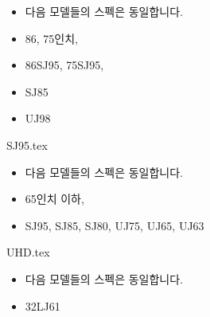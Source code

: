 \documentclass{beamer}
\begin{document}
\begin{frame}[t]{}
\tableofcontents
\large
\begin{itemize}
\large \item 다음 모델들의 스펙은 동일합니다.
\large \item 86, 75인치,
\large \item 86SJ95, 75SJ95, 
\large \item SJ85
\large \item UJ98
\end{itemize}
\end{frame}

{SJ95.tex}			%

\begin{frame}[t]{}
\tableofcontents
\large
\begin{itemize}
\large \item 다음 모델들의 스펙은 동일합니다.
\large \item 65인치 이하, 
\large \item SJ95, SJ85, SJ80, UJ75, UJ65, UJ63
\end{itemize}
\end{frame}

{UHD.tex}



%


\begin{frame}[t]{}
\tableofcontents
\huge
\begin{itemize}
\large \item 다음 모델들의 스펙은 동일합니다.
\huge \item 32LJ61
\end{itemize}
\end{frame}
\end{document}
